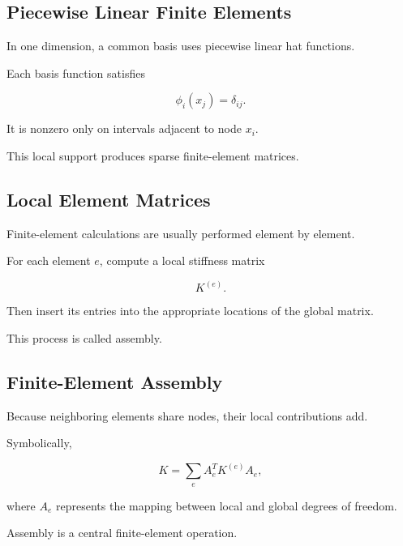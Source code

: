 \subsection{Piecewise Linear Finite Elements}
\label{subsec:piecewise-linear-fem}

In one dimension, a common basis uses piecewise linear hat functions.

Each basis function satisfies

\[
\boxed{
\phi_i(x_j)
=
\delta_{ij}.
}
\]

It is nonzero only on intervals adjacent to node \(x_i\).

This local support produces sparse finite-element matrices.

\subsection{Local Element Matrices}
\label{subsec:local-element-matrices}

Finite-element calculations are usually performed element by element.

For each element \(e\), compute a local stiffness matrix

\[
\boxed{
K^{(e)}.
}
\]

Then insert its entries into the appropriate locations of the global
matrix.

This process is called assembly.

\subsection{Finite-Element Assembly}
\label{subsec:finite-element-assembly}

Because neighboring elements share nodes, their local contributions add.

Symbolically,

\[
\boxed{
K
=
\sum_e
A_e^T
K^{(e)}
A_e,
}
\]

where \(A_e\) represents the mapping between local and global degrees of
freedom.

Assembly is a central finite-element operation.

